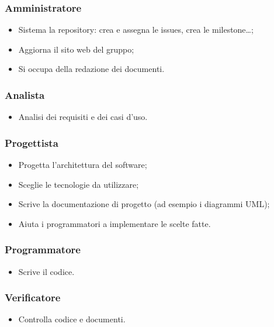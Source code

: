 \documentclass[11pt,a4paper]{article}
\begin{document}
\subsubsection{Amministratore}
\begin{itemize}
    \item Sistema la repository: crea e assegna le issues, crea le milestone…;
    \item Aggiorna il sito web del gruppo;
    \item Si occupa della redazione dei documenti.
\end{itemize}

\subsubsection{Analista}
\begin{itemize}
    \item Analisi dei requisiti e dei casi d'uso.
\end{itemize}

\subsubsection{Progettista}
\begin{itemize}
    \item Progetta l’architettura del software;
    \item Sceglie le tecnologie da utilizzare;
    \item Scrive la documentazione di progetto (ad esempio i diagrammi UML);
    \item Aiuta i programmatori a implementare le scelte fatte.
\end{itemize}

\subsubsection{Programmatore}
\begin{itemize}
    \item Scrive il codice.
\end{itemize}

\subsubsection{Verificatore}
\begin{itemize}
    \item Controlla codice e documenti.
\end{itemize}
\end{document}
